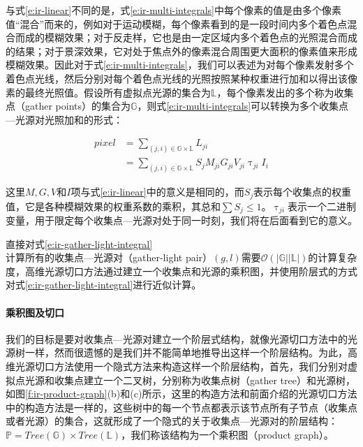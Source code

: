 与式\ref{e:ir-linear}不同的是，式\ref{e:ir-multi-integrals}中每个像素的值是由多个像素值“混合”而来的，例如对于运动模糊，每个像素看到的是一段时间内多个着色点混合而成的模糊效果；对于反走样，它也是由一定区域内多个着色点的光照混合而成的结果；对于景深效果，它对处于焦点外的像素混合周围更大面积的像素值来形成模糊效果。因此对于式\ref{e:ir-multi-integrals}，我们可以表述为对每个像素发射多个着色点光线，然后分别对每个着色点光线的光照按照某种权重进行加和以得出该像素的最终光照值。假设所有虚拟点光源的集合为$\mathds{L}$，每个像素发出的多个称为收集点（gather points）的集合为$\mathds{G}$，则式\ref{e:ir-multi-integrals}可以转换为多个收集点—光源对光照加和的形式：

\begin{equation}\label{e:ir-gather-light-integral}
\begin{aligned}
	pixel&=\sum_{(j,i)\in\mathds{G}\times\mathds{L}}L_{ji}\\
	     &=\sum_{(j,i)\in\mathds{G}\times\mathds{L}}S_jM_{ji}G_{ji}V_{ji}\uptau_{ji}I_i
\end{aligned}
\end{equation}

\noindent 这里$M,G,V$和$I$项与式\ref{e:ir-linear}中的意义是相同的，而$S_j$表示每个收集点的权重值，它是各种模糊效果的权重系数的乘积，其总和$\sum S_j\leq 1$。$\uptau_{ji}$表示一个二进制变量，用于限定每个收集点—光源对处于同一时刻，我们将在后面看到它的意义。

直接对式\ref{e:ir-gather-light-integral}计算所有的收集点—光源对（gather-light pair）$(g,l)$需要$\mathcal{O}(|\mathds{G}||\mathds{L}|)$的计算复杂度，高维光源切口方法通过建立一个收集点和光源的乘积图，并使用阶层式的方式对式\ref{e:ir-gather-light-integral}进行近似计算。




\paragraph{乘积图及切口}
我们的目标是要对收集点—光源对建立一个阶层式结构，就像光源切口方法中的光源树一样，然而很遗憾的是我们并不能简单地推导出这样一个阶层结构。为此，高维光源切口方法使用一个隐式方法来构造这样一个阶层结构，首先，我们分别对虚拟点光源和收集点建立一个二叉树，分别称为收集点树（gather tree）和光源树，如图\ref{f:ir-product-graph}(b)和(c)所示，这里的构造方法和前面介绍的光源切口方法中的构造方法是一样的，这些树中的每一个节点都表示该节点所有子节点（收集点或者光源）的集合，这就形成了一个隐式的关于收集点—光源对的阶层结构：$\mathds{P}=Tree(\mathds{G})\times Tree(\mathds{L})$，我们称该结构为一个乘积图（product graph）。

